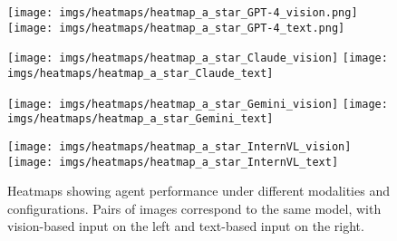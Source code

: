 \begin{figure}[htbp]
    \centering
    
    \texttt{[image: imgs/heatmaps/heatmap\_a\_star\_GPT-4\_vision.png]}
    \texttt{[image: imgs/heatmaps/heatmap\_a\_star\_GPT-4\_text.png]}
    
    \texttt{[image: imgs/heatmaps/heatmap\_a\_star\_Claude\_vision]}
    \texttt{[image: imgs/heatmaps/heatmap\_a\_star\_Claude\_text]}
    
    \texttt{[image: imgs/heatmaps/heatmap\_a\_star\_Gemini\_vision]}
    \texttt{[image: imgs/heatmaps/heatmap\_a\_star\_Gemini\_text]}

    \texttt{[image: imgs/heatmaps/heatmap\_a\_star\_InternVL\_vision]}
    \texttt{[image: imgs/heatmaps/heatmap\_a\_star\_InternVL\_text]}

    \caption{Heatmaps showing agent performance under different modalities and configurations. Pairs of images correspond to the same model, with vision-based input on the left and text-based input on the right.}
    \label{fig:heatmap_grid}
\end{figure}